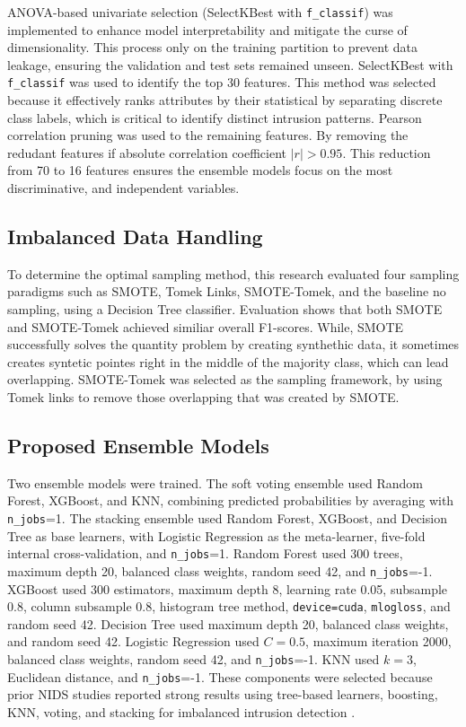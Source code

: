 \documentclass[conference,a4paper]{IEEEtran}
\begin{document}
ANOVA-based univariate selection (SelectKBest with \texttt{f\_classif}) was implemented to enhance model interpretability and mitigate the curse of dimensionality. This process only on the training partition to prevent data leakage, ensuring the validation and test sets remained unseen. SelectKBest with \texttt{f\_classif} was used to identify the top 30 features. This method was selected because it effectively ranks attributes by their statistical by separating discrete class labels, which is critical to identify distinct intrusion patterns. Pearson correlation pruning was used to the remaining features. By removing the redudant features if absolute correlation coefficient $|r| > 0.95$. This reduction from 70 to 16 features ensures the ensemble models focus on the most discriminative, and independent variables.


\subsection{Imbalanced Data Handling}

To determine the optimal sampling method, this research evaluated four sampling paradigms such as SMOTE, Tomek Links, SMOTE-Tomek, and the baseline no sampling, using a Decision Tree classifier. Evaluation shows that both SMOTE and SMOTE-Tomek achieved similiar overall F1-scores. While, SMOTE successfully solves the quantity problem by creating synthethic data, it sometimes creates syntetic pointes right in the middle of the majority class, which can lead overlapping. SMOTE-Tomek was selected as the sampling framework, by using Tomek links to remove those overlapping that was created by SMOTE.

\subsection{Proposed Ensemble Models}

Two ensemble models were trained. The soft voting ensemble used Random Forest, XGBoost, and KNN, combining predicted probabilities by averaging with \texttt{n\_jobs}=1. The stacking ensemble used Random Forest, XGBoost, and Decision Tree as base learners, with Logistic Regression as the meta-learner, five-fold internal cross-validation, and \texttt{n\_jobs}=1. Random Forest used 300 trees, maximum depth 20, balanced class weights, random seed 42, and \texttt{n\_jobs}=-1. XGBoost used 300 estimators, maximum depth 8, learning rate 0.05, subsample 0.8, column subsample 0.8, histogram tree method, \texttt{device=cuda}, \texttt{mlogloss}, and random seed 42. Decision Tree used maximum depth 20, balanced class weights, and random seed 42. Logistic Regression used \(C=0.5\), maximum iteration 2000, balanced class weights, random seed 42, and \texttt{n\_jobs}=-1. KNN used \(k=3\), Euclidean distance, and \texttt{n\_jobs}=-1.
These components were selected because prior NIDS studies reported strong results using tree-based learners, boosting, KNN, voting, and stacking for imbalanced intrusion detection \cite{farooqi2024enhancing,urmi2024stacked,nassreddine2025ensemble}.
\end{document}
